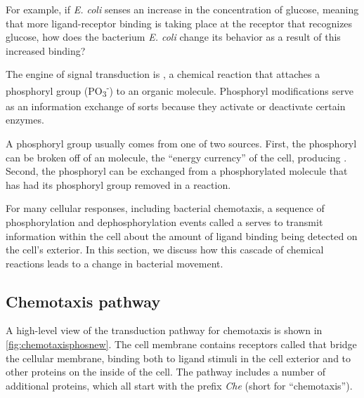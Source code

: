 For example, if \textit{E. coli} senses an increase in the concentration of glucose, meaning that more ligand-receptor binding is taking place at the receptor that recognizes glucose, how does the bacterium \textit{E. coli} change its behavior as a result of this increased binding?

The engine of signal transduction is , a chemical reaction that attaches a phosphoryl group (PO\textsubscript{3}\textsuperscript{-}) to an organic molecule.  Phosphoryl modifications serve as an information exchange of sorts because they activate or deactivate certain enzymes.

A phosphoryl group usually comes from one of two sources. First, the phosphoryl can be broken off of an  molecule, the ``energy currency'' of the cell, producing . Second, the phosphoryl can be exchanged from a phosphorylated molecule that has had its phosphoryl group removed in a  reaction.

For many cellular responses, including bacterial chemotaxis, a sequence of phosphorylation and dephosphorylation events called a  serves to transmit information within the cell about the amount of ligand binding being detected on the cell's exterior. In this section, we discuss how this cascade of chemical reactions leads to a change in bacterial movement.

\FloatBarrier
{}
{}
\subsection{Chemotaxis pathway}

A high-level view of the transduction pathway for chemotaxis is shown in \autoref{fig:chemotaxisphosnew}. The cell membrane contains receptors called  that bridge the cellular membrane, binding both to ligand stimuli in the cell exterior and to other proteins on the inside of the cell. The pathway includes a number of additional proteins, which all start with the prefix \textit{Che} (short for ``chemotaxis'').

